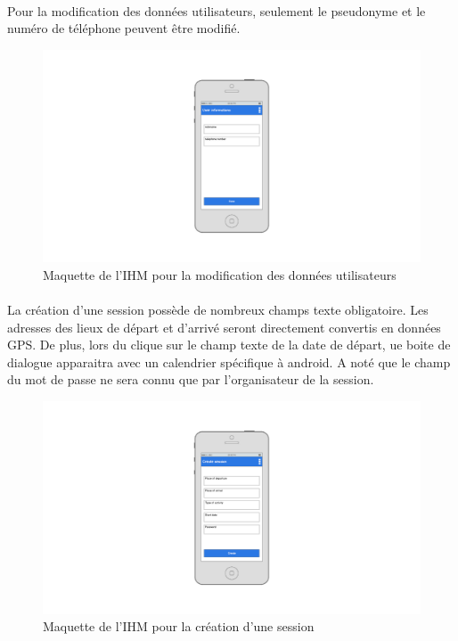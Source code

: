 \documentclass[titlepage, 12pt]{report}
\begin{document}
\paragraph{}Pour la modification des données utilisateurs, seulement le pseudonyme et le numéro de téléphone peuvent être modifié.

\begin{figure}[!h]
	\caption{Maquette de l'IHM pour la modification des données utilisateurs}
	\label{modify_user_account}
	\centering
	\includegraphics[scale=0.2]{images/mockups/modify_user_profile.png}
\end{figure}

\paragraph{}La création d'une session possède de nombreux champs texte obligatoire. Les adresses des lieux de départ et d'arrivé seront directement convertis en données GPS. De plus, lors du clique sur le champ texte de la date de départ, ue boite de dialogue apparaitra avec un calendrier spécifique à android. A noté que le champ du mot de passe ne sera connu que par l'organisateur de la session.

\begin{figure}[!h]
	\caption{Maquette de l'IHM pour la création d'une session}
	\label{create_session}
	\centering
	\includegraphics[scale=0.2]{images/mockups/create_session.png}
\end{figure}
\end{document}
